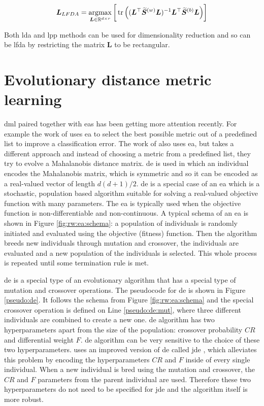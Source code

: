 \documentclass[12pt,a4paper]{report}
\begin{document}
\begin{equation}
\bm{L}_{LFDA} = \operatorname*{argmax}_{\bm{L} \in \mathbb{R}^{d \times r}} \bigg[\operatorname*{tr}\Big( ( \bm{L}^\top\widetilde{\bm{S}}^{(w)}\bm{L} )^{-1} \bm{L}^\top\widetilde{\bm{S}}^{(b)}\bm{L} \Big)\bigg] \label{eq:rw:lfda:objective}
\end{equation}

Both \ac{lda} and \ac{lpp} methods can be used for dimensionality reduction and so can be \ac{lfda} by restricting the matrix $\bm{L}$ to be rectangular.

\section{Evolutionary distance metric learning} \label{chap:rw:fukui}


\Acl{dml} paired together with \acp{ea} has been getting more attention recently. For example the work of \cite{koloseni2012optimized} uses \ac{ea} to select the best possible metric out of a predefined list to improve a classification error. The work of \cite{fukui2013evolutionary} also uses \ac{ea}, but takes a different approach and instead of choosing a metric from a predefined list, they try to evolve a Mahalanobis distance matrix. \Acl{de} is used in which an individual encodes the Mahalanobis matrix, which is symmetric and so it can be encoded as a real-valued vector of length $d(d+1)/2$. \Acl{de} is a special case of an \ac{ea} which is a stochastic, population based algorithm suitable for solving a real-valued objective function with many parameters. The \ac{ea} is typically used when the objective function is non-differentiable and non-continuous. A typical schema of an \ac{ea} is shown in Figure \ref{fig:rw:ea:schema}: a population of individuals is randomly initiated and evaluated using the objective (fitness) function. Then the algorithm breeds new individuals through mutation and crossover, the individuals are evaluated and a new population of the individuals is selected. This whole process is repeated until some termination rule is met.

\Ac{de} is a special type of an evolutionary algorithm that has a special type of mutation and crossover operations. The pseudocode for \ac{de} is shown in Figure \ref{pseudo:de}. It follows the schema from Figure \ref{fig:rw:ea:schema} and the special crossover operation is defined on Line \ref{pseudo:de:mut}, where three different individuals are combined to create a new one. \ac{de} algorithm has two hyperparameters apart from the size of the population: crossover probability $CR$ and differential weight $F$. \ac{de} algorithm can be very sensitive to the choice of these two hyperparameters. \cite{fukui2013evolutionary} uses an improved version of \ac{de} called \acf{jde} \citep{brest2006self}, which alleviates this problem by encoding the hyperparameters $CR$ and $F$ inside of every single individual. When a new individual is bred using the mutation and crossover, the $CR$ and $F$ parameters from the parent individual are used. Therefore these two hyperparameters do not need to be specified for \ac{jde} and the algorithm itself is more robust.
\end{document}
